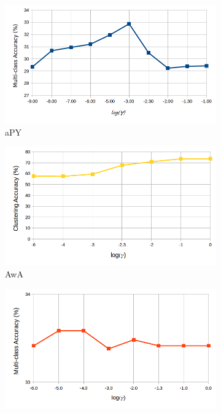 \begin{figure}[!th]
\centering
\begin{subfigure}[b]{0.43\linewidth}
    \includegraphics[width=\linewidth]{images/nn_param_apy}
    \caption{aPY}
\end{subfigure}
%
\begin{subfigure}[b]{0.43\linewidth}
    \includegraphics[width=\linewidth]{images/nn_gamma_awa}
    \caption{AwA}
\end{subfigure}
%
\begin{subfigure}[b]{0.43\linewidth}
    \includegraphics[width=\linewidth]{images/nn_param_birds}

\end{subfigure}
\end{figure}
